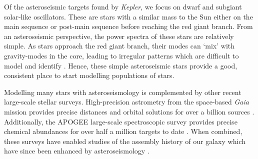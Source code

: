 
Of the asteroseismic targets found by \emph{Kepler}, we focus on dwarf and subgiant solar-like oscillators. These are stars with a similar mass to the Sun either on the main sequence or post-main sequence before reaching the red giant branch. From an asteroseismic perspective, the power spectra of these stars are relatively simple. As stars approach the red giant branch, their modes can `mix' with gravity-modes in the core, leading to irregular patterns which are difficult to model and identify \needcite. Hence, these simple asteroseismic stars provide a good, consistent place to start modelling populations of stars.


Modelling many stars with asteroseismology is complemented by other recent large-scale stellar surveys. High-precision astrometry from the space-based \emph{Gaia} mission provides precise distances and orbital solutions for over a billion sources \citep{GaiaCollaboration.Prusti.ea2016}. Additionally, the APOGEE large-scale spectroscopic survey provides precise chemical abundances for over half a million targets to date \citep{Majewski.Schiavon.ea2017,Jonsson.Holtzman.ea2020}. When combined, these surveys have enabled studies of the assembly history of our galaxy \citep[e.g.][]{Helmi.Babusiaux.ea2018} which have since been enhanced by asteroseismology \citep{Chaplin.Serenelli.ea2020,Montalban.Mackereth.ea2021}.

